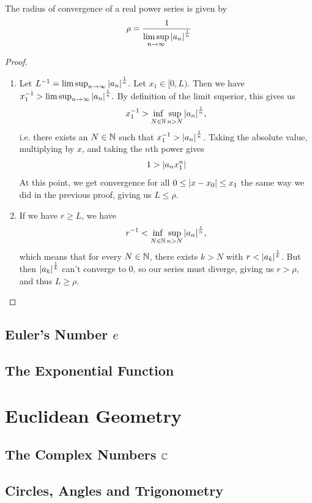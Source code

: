 \begin{theorem}
	\label{th:realcauchyhadamard}
	The radius of convergence of a real power series is given by
	\begin{align*}
		\rho = \frac{1}{\displaystyle \limsup_{n \to \infty} \abs{a_n}^\frac{1}{n}}
	\end{align*}
\end{theorem}
\begin{proof}
	\begin{enumerate}
		\item Let
		$L^{-1} = \limsup_{n \to \infty} \abs{a_n}^\frac{1}{n}.$
		Let $x_1 \in [0,L)$. Then we have
		$x_1^{-1} > \limsup_{n \to \infty} \abs{a_n}^\frac{1}{n}.$
		By definition of the limit superior, this gives us
		\begin{align*}
			x_1^{-1} > \inf_{N \in \bN} \sup_{n > N} \abs{a_n}^\frac{1}{n},
		\end{align*}
		i.e. there exists an $N \in \mathbb{N}$ such that $x_1^{-1} > \abs{a_n}^\frac{1}{n}$. Taking the absolute value, multiplying by $x$, and taking the $n$th power gives
		\begin{align*}
			1 > \abs{a_n x_1^n}
		\end{align*}
		At this point, we get convergence for all $0 \leq \abs{x - x_0} \leq x_1$ the same way we did in the previous proof, giving us $L \leq \rho$.
		\item If we have $r \geq L$, we have
		\begin{align*}
			r^{-1} < \inf_{N \in \bN} \sup_{n > N} \abs{a_n}^\frac{1}{n},
		\end{align*}
		which means that for every $N \in \mathbb{N}$, there exists $k > N$ with $r < \abs{a_k}^\frac{1}{k}$. But then $\abs{a_k}^\frac{1}{k}$ can't converge to $0$, so our series must diverge, giving us $r > \rho$, and thus $L \geq \rho$.
	\end{enumerate}
\end{proof}
\section{Euler's Number $e$}
\section{The Exponential Function}
\chapter{Euclidean Geometry}
\section{The Complex Numbers $\mathbb{C}$}
\section{Circles, Angles and Trigonometry}